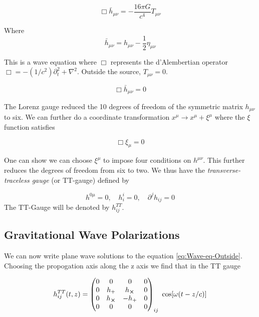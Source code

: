 \documentclass[12pt,a4paper,oneside]{book}
\begin{document}
\begin{equation}
\label{eq:Wave-eq-Lorenz}
\Box \bar{h}_{\mu \nu} = - \frac{16 \pi G}{c^4} T_{\mu \nu}
\end{equation}

Where
\begin{equation}
\label{eq: hbar}
\bar{h}_{\mu \nu} = h_{\mu \nu} - \frac{1}{2} \eta_{\mu \nu}
\end{equation}

This is a wave equation where $\Box$ represents the d'Alembertian operator $\Box = - (1/c^2)\partial^2_{t} + \nabla^2$. Outside the source, $T_{\mu \nu} = 0$. 

\begin{equation}
\label{eq:Wave-eq-Outside}
\Box \bar{h}_{\mu \nu} = 0
\end{equation}

The Lorenz gauge reduced the 10 degrees of freedom of the symmetric matrix $h_{\mu \nu}$ to six. We can further do a coordinate transformation $x^{\mu} \rightarrow x^{\mu} + \xi^{\mu}$ where the $\xi$ function satisfies

\begin{equation}
\label{eq:xi}
\Box \xi_{\mu} = 0
\end{equation}

One can show we can choose $\xi^{\mu}$ to impose four conditions on $h^{\mu \nu}$. This further reduces the degrees of freedom from six to two. We thus have the \emph{transverse-traceless gauge} (or TT-gauge) defined by

\begin{equation}
\label{eq: TT gauge}
h^{0 \mu} = 0, \quad h^{i}_{i} = 0, \quad \partial^{j}h_{ij} = 0
\end{equation}
The TT-Gauge will be denoted by $h^{TT}_{ij}$.


\subsection*{Gravitational Wave Polarizations}

 We can now write plane wave solutions to the equation \eqref{eq:Wave-eq-Outside}. Choosing the propogation axis along the z axis we find that in the TT gauge
 
\begin{equation}
\label{eq:Wave-eq-sol}
h^{TT}_{ij}(t,z) = \begin{pmatrix}
0 & 0 & 0 & 0 \\
0  & h_{+} & h_{\cross} & 0 \\
0 & h_{\cross} & -h_{+} & 0 \\
0 & 0 & 0 & 0
\end{pmatrix}_{ij} \ \cos[\omega (t - z/c)]
\end{equation}
\end{document}
